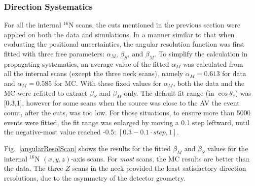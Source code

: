 \subsubsection{Direction Systematics} \label{sect:dirSystematics}

For all the internal $^{16}$N scans, the cuts mentioned in the previous section were applied on both the data and simulations. In a manner similar to that when evaluating the positional uncertainties, the angular resolution function was first fitted with three free parameters: $\alpha_M$, $\beta_S$, and $\beta_M$. To simplify the calculation in propagating systematics, an average value of the fitted $\alpha_M$ was calculated from all the internal scans (except the three neck scans), namely $\alpha_M =  0.613$ for data and $\alpha_M = 0.585$ for MC. With these fixed values for $\alpha_M$, both the data and the MC were refitted to extract $\beta_S$ and $\beta_M$ only. The default fit range (in $\cos \theta_e$) was [0.3,1], however for some scans when the source was close to the AV the event count, after the cuts, was too low. For those situations, to ensure more than 5000 events were fitted, the fit range was enlarged by moving a 0.1 step leftward, until the negative-most value reached -0.5: $[0.3-0.1 \cdot step, 1]$.

Fig.~\ref{angularResolScan} shows the results for the fitted $\beta_M$ and $\beta_S$ values for the internal $^{16}$N $(x,y,z)$-axis scans. For {\em most} scans, the MC results are better than the data. The three $Z$ scans in the neck provided the least satisfactory direction resolutions, due to the asymmetry of the detector geometry.

